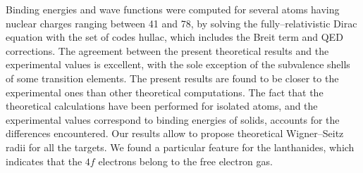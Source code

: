 Binding energies and wave functions were computed for several atoms
having nuclear charges ranging between 41 and 78, by solving the
fully--relativistic Dirac equation with the set of codes {\sc hullac}, 
which includes the Breit term and QED corrections. The agreement between 
the present theoretical results and the experimental values is excellent,
with the sole exception of the subvalence shells of some transition
elements. The present results are found to be closer to the experimental 
ones than other theoretical computations. 
The fact that the theoretical calculations have been performed
for isolated atoms, and
the experimental values correspond to binding energies of solids,
accounts for the differences encountered. 
Our results allow to propose theoretical Wigner--Seitz radii for all 
the targets. We found a particular feature for the lanthanides, which
indicates that the $4f$ electrons belong to the free electron gas.

